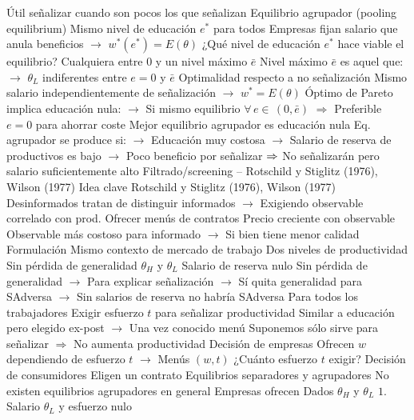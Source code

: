 \documentclass{nuevotema}
\begin{document}
\begin{esquemal}
				\4[$\Rightarrow$] Útil señalizar cuando son pocos los que señalizan
			\3 Equilibrio agrupador (pooling equilibrium)
				\4 Mismo nivel de educación $e^*$ para todos
				\4 Empresas fijan salario que anula beneficios
				\4[] $\to$ $w^*(e^*) = E(\theta)$
				\4 ¿Qué nivel de educación $e^*$ hace viable el equilibrio?
				\4[] Cualquiera entre 0 y un nivel máximo $\bar{e}$
				\4[] Nivel máximo $\bar{e}$ es aquel que:
				\4[] $\to$ $\theta_L$ indiferentes entre $e=0$ y $\bar{e}$
				\4 Optimalidad respecto a no señalización
				\4[] Mismo salario independientemente de señalización
				\4[] $\to$ $w^* = E(\theta)$
				\4[] Óptimo de Pareto implica educación nula:
				\4[] $\to$ Si mismo equilibrio $\forall \, e \in \, (0, \bar{e})$
				\4[] $\Rightarrow$ Preferible $e=0$ para ahorrar coste
				\4[$\Rightarrow$] Mejor equilibrio agrupador es educación nula
				\4[$\then$] Eq. agrupador se produce si:
				\4[] $\to$ Educación muy costosa
				\4[] $\to$ Salario de reserva de productivos es bajo
				\4[] $\to$ Poco beneficio por señalizar
				\4[] $\then$ No señalizarán pero salario suficientemente alto
		\2 Filtrado/screening -- Rotschild y Stiglitz (1976), Wilson (1977)
			\3 Idea clave
				\4 Rotschild y Stiglitz (1976), Wilson (1977)
				\4 Desinformados tratan de distinguir informados
				\4[] $\to$ Exigiendo observable correlado con prod.
				\4 Ofrecer menús de contratos
				\4[] Precio creciente con observable
				\4[] Observable más costoso para informado
				\4[] $\to$ Si bien tiene menor calidad
			\3 Formulación
				\4 Mismo contexto de mercado de trabajo
				\4 Dos niveles de productividad
				\4[] Sin pérdida de generalidad
				\4[] $\theta_H$ y $\theta_L$
				\4 Salario de reserva nulo
				\4[] Sin pérdida de generalidad
				\4[] $\to$ Para explicar señalización
				\4[] $\to$ Sí quita generalidad para SAdversa
				\4[] $\to$ Sin salarios de reserva no habría SAdversa
				\4[] Para todos los trabajadores
				\4 Exigir esfuerzo $t$ para señalizar productividad
				\4[] Similar a educación pero elegido ex-post
				\4[] $\to$ Una vez conocido menú
				\4[] Suponemos sólo sirve para señalizar
				\4[] $\Rightarrow$ No aumenta productividad
				\4 Decisión de empresas
				\4[] Ofrecen $w$ dependiendo de esfuerzo $t$
				\4[] $\to$ Menús $(w, t)$
				\4[] ¿Cuánto esfuerzo $t$ exigir?
				\4 Decisión de consumidores
				\4[] Eligen un contrato
			\3 Equilibrios separadores y agrupadores
				\4 No existen equilibrios agrupadores en general
				\4 Empresas ofrecen
				\4[] Dados $\theta_H$ y $\theta_L$
				\4[] $1.$ Salario $\theta_L$ y esfuerzo nulo

\end{esquemal}
\end{document}
